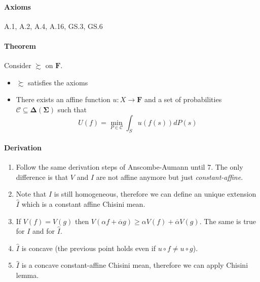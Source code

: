 \documentclass[landscape, 12pt]{extarticle}
\begin{document}
\begin{multicols}{2}
	\paragraph{Axioms} A.1, A.2, A.4, A.16, GS.3, GS.6

	\paragraph{Theorem}
	Consider $\succsim$ on $\bm F$.
	\begin{itemize}
		\item $\succsim$ satisfies the axioms
		\item There exists an affine function	$u: X \to \bm F$
		      and a set of probabilities $\mathcal C \subseteq \bm \Delta(\bm \Sigma)$
		      such that
		      \[
			      U(f) = \min_{P\in \mathcal C} \int_S u(f(s)) dP(s)
		      \]
	\end{itemize}

	\paragraph{Derivation}
	\begin{enumerate}
		\item Follow the same derivation steps of Anscombe-Aumann until 7.
		      The only difference is that $V$ and $I$ are not affine anymore
		      but just \textit{constant-affine}.
		\item Note that $I$ is still homogeneous, therefore we can define an unique extension $\hat I$
		      which is a constant affine Chisini mean.
		\item If $V(f) = V(g)$ then
		      $V(\alpha f + \overline \alpha g) \geq \alpha V(f) + \overline \alpha V(g)$.
		      The same is true for $I$ and for $\hat I$.
		\item $\hat I$ is concave (the previous point holds even if $u \circ f \neq u \circ g$).
		\item $\hat I$ is a concave constant-affine Chisini mean, therefore we can apply Chisini lemma.
	\end{enumerate}
\end{multicols}
\end{document}

